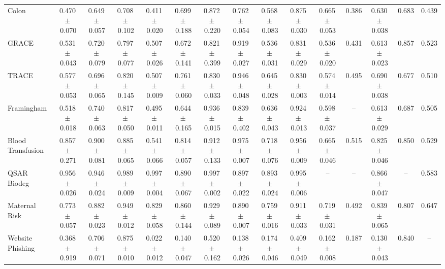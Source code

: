 \documentclass[8pt]{extarticle}
\begin{document}
\begin{longtable}{l*{14}{c}}
Colon & 0.470\,$\pm$\,0.070 & 0.649\,$\pm$\,0.057 & 0.708\,$\pm$\,0.102 & 0.411\,$\pm$\,0.020 & 0.699\,$\pm$\,0.188 & 0.872\,$\pm$\,0.220 & 0.762\,$\pm$\,0.054 & 0.568\,$\pm$\,0.083 & 0.875\,$\pm$\,0.030 & 0.665\,$\pm$\,0.053 & 0.386 & 0.630\,$\pm$\,0.038 & 0.683 & 0.439 \\
GRACE & 0.531\,$\pm$\,0.043 & 0.720\,$\pm$\,0.079 & 0.797\,$\pm$\,0.077 & 0.507\,$\pm$\,0.026 & 0.672\,$\pm$\,0.141 & 0.821\,$\pm$\,0.399 & 0.919\,$\pm$\,0.027 & 0.536\,$\pm$\,0.031 & 0.831\,$\pm$\,0.029 & 0.536\,$\pm$\,0.020 & 0.431 & 0.613\,$\pm$\,0.023 & 0.857 & 0.523 \\
TRACE & 0.577\,$\pm$\,0.053 & 0.696\,$\pm$\,0.065 & 0.820\,$\pm$\,0.145 & 0.507\,$\pm$\,0.009 & 0.761\,$\pm$\,0.060 & 0.830\,$\pm$\,0.033 & 0.946\,$\pm$\,0.048 & 0.645\,$\pm$\,0.028 & 0.830\,$\pm$\,0.003 & 0.574\,$\pm$\,0.014 & 0.495 & 0.690\,$\pm$\,0.038 & 0.677 & 0.510 \\
Framingham & 0.518\,$\pm$\,0.018 & 0.740\,$\pm$\,0.063 & 0.817\,$\pm$\,0.050 & 0.495\,$\pm$\,0.011 & 0.644\,$\pm$\,0.165 & 0.936\,$\pm$\,0.015 & 0.839\,$\pm$\,0.402 & 0.636\,$\pm$\,0.043 & 0.924\,$\pm$\,0.013 & 0.598\,$\pm$\,0.037 & -- & 0.613\,$\pm$\,0.029 & 0.687 & 0.505 \\
Blood Transfusion & 0.857\,$\pm$\,0.271 & 0.900\,$\pm$\,0.081 & 0.885\,$\pm$\,0.065 & 0.541\,$\pm$\,0.066 & 0.814\,$\pm$\,0.057 & 0.912\,$\pm$\,0.133 & 0.975\,$\pm$\,0.007 & 0.718\,$\pm$\,0.076 & 0.956\,$\pm$\,0.009 & 0.665\,$\pm$\,0.046 & 0.515 & 0.825\,$\pm$\,0.046 & 0.850 & 0.529 \\
QSAR Biodeg & 0.956\,$\pm$\,0.026 & 0.946\,$\pm$\,0.024 & 0.989\,$\pm$\,0.009 & 0.997\,$\pm$\,0.004 & 0.890\,$\pm$\,0.067 & 0.997\,$\pm$\,0.002 & 0.897\,$\pm$\,0.022 & 0.893\,$\pm$\,0.024 & 0.995\,$\pm$\,0.006 & -- & -- & 0.866\,$\pm$\,0.047 & -- & 0.583 \\
Maternal Risk & 0.773\,$\pm$\,0.057 & 0.882\,$\pm$\,0.023 & 0.949\,$\pm$\,0.012 & 0.829\,$\pm$\,0.058 & 0.860\,$\pm$\,0.144 & 0.929\,$\pm$\,0.089 & 0.890\,$\pm$\,0.007 & 0.759\,$\pm$\,0.016 & 0.911\,$\pm$\,0.033 & 0.719\,$\pm$\,0.031 & 0.492 & 0.839\,$\pm$\,0.065 & 0.807 & 0.647 \\
Website Phishing & 0.368\,$\pm$\,0.919 & 0.706\,$\pm$\,0.071 & 0.875\,$\pm$\,0.010 & 0.022\,$\pm$\,0.012 & 0.140\,$\pm$\,0.047 & 0.520\,$\pm$\,0.162 & 0.138\,$\pm$\,0.026 & 0.174\,$\pm$\,0.046 & 0.409\,$\pm$\,0.049 & 0.162\,$\pm$\,0.008 & 0.187 & 0.130\,$\pm$\,0.043 & 0.840 & -- \\
\end{longtable}
\end{document}
